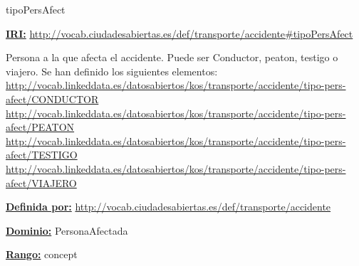 \begin{mybox}{tipoPersAfect}
\begin{flushleft}
\underline{\textbf{IRI:}}
\url{http://vocab.ciudadesabiertas.es/def/transporte/accidente#tipoPersAfect}
\newline

Persona a la que afecta el accidente. Puede ser Conductor, peaton, testigo o viajero. Se han definido los siguientes elementos:
\newline \url{http://vocab.linkeddata.es/datosabiertos/kos/transporte/accidente/tipo-pers-afect/CONDUCTOR}
\newline \url{http://vocab.linkeddata.es/datosabiertos/kos/transporte/accidente/tipo-pers-afect/PEATON}
\newline \url{http://vocab.linkeddata.es/datosabiertos/kos/transporte/accidente/tipo-pers-afect/TESTIGO}
\newline \url{http://vocab.linkeddata.es/datosabiertos/kos/transporte/accidente/tipo-pers-afect/VIAJERO}
\newline

\underline{\textbf{Definida por:}}\newline
\url{http://vocab.ciudadesabiertas.es/def/transporte/accidente}
\newline

\underline{\textbf{Dominio:}} PersonaAfectada
\newline

\underline{\textbf{Rango:}} concept
\newline

\end{flushleft}
\end{mybox}














